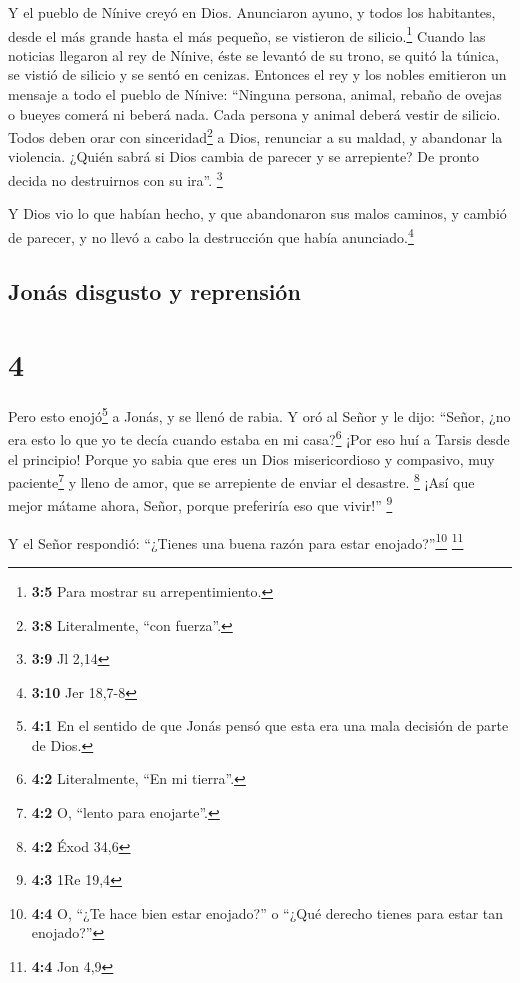  Y el pueblo de Nínive creyó en Dios. Anunciaron ayuno, y
todos los habitantes, desde el más grande hasta el más pequeño, se
vistieron de silicio.\footnote{\textbf{3:5} Para mostrar su
  arrepentimiento.}  Cuando las noticias llegaron al rey
de Nínive, éste se levantó de su trono, se quitó la túnica, se vistió de
silicio y se sentó en cenizas.  Entonces el rey y los
nobles emitieron un mensaje a todo el pueblo de Nínive: ``Ninguna
persona, animal, rebaño de ovejas o bueyes comerá ni beberá nada.
 Cada persona y animal deberá vestir de silicio. Todos
deben orar con sinceridad\footnote{\textbf{3:8} Literalmente, ``con
  fuerza''.} a Dios, renunciar a su maldad, y abandonar la violencia.
 ¿Quién sabrá si Dios cambia de parecer y se arrepiente?
De pronto decida no destruirnos con su ira''. \footnote{\textbf{3:9} Jl
  2,14}

 Y Dios vio lo que habían hecho, y que abandonaron sus
malos caminos, y cambió de parecer, y no llevó a cabo la destrucción que
había anunciado.\footnote{\textbf{3:10} Jer 18,7-8}

\hypertarget{jonuxe1s-disgusto-y-reprensiuxf3n}{%
\subsection{Jonás disgusto y
reprensión}\label{jonuxe1s-disgusto-y-reprensiuxf3n}}

\hypertarget{section-3}{%
\section{4}\label{section-3}}

 Pero esto enojó\footnote{\textbf{4:1} En el sentido de
  que Jonás pensó que esta era una mala decisión de parte de Dios.} a
Jonás, y se llenó de rabia.  Y oró al Señor y le dijo:
``Señor, ¿no era esto lo que yo te decía cuando estaba en mi
casa?\footnote{\textbf{4:2} Literalmente, ``En mi tierra''.} ¡Por eso
huí a Tarsis desde el principio! Porque yo sabia que eres un Dios
misericordioso y compasivo, muy paciente\footnote{\textbf{4:2} O,
  ``lento para enojarte''.} y lleno de amor, que se arrepiente de enviar
el desastre. \footnote{\textbf{4:2} Éxod 34,6}  ¡Así que
mejor mátame ahora, Señor, porque preferiría eso que vivir!''
\footnote{\textbf{4:3} 1Re 19,4}

 Y el Señor respondió: ``¿Tienes una buena razón para
estar enojado?''\footnote{\textbf{4:4} O, ``¿Te hace bien estar
  enojado?'' o ``¿Qué derecho tienes para estar tan enojado?''}
\footnote{\textbf{4:4} Jon 4,9}

